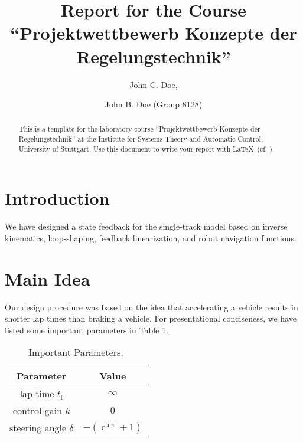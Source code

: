 \documentclass[pdf]{ifacconf}
\begin{document}
\begin{frontmatter}

\title{Report for the Course ``Projektwettbewerb Konzepte der Regelungstechnik''}


\author{\underline{John C. Doe},} 
\author{John B. Doe (Group 8128)} 

\begin{abstract}                          %
This is a template for the laboratory course ``Projektwettbewerb Konzepte der Regelungstechnik'' at the Institute for Systems Theory and Automatic Control, University of Stuttgart. Use this document to write your report with \LaTeX\ (cf. \cite{Knuth2005}).
\end{abstract}

\end{frontmatter}

\section{Introduction}
We have designed a state feedback for the single-track model based on inverse kinematics, loop-shaping, feedback linearization, and robot navigation functions.

\section{Main Idea}
Our design procedure was based on the idea that accelerating a vehicle results in shorter lap times than braking a vehicle. For presentational conciseness, we have listed some important parameters in Table 1.

\begin{table}[h]
\caption{Important Parameters.}
\label{table:working plan}
\centering
\begin{tabular}{|c|c|}
\hline
\bfseries Parameter & \bfseries Value \\ \hline \hline
lap time $t_{\text{f}}$ & $\infty$ \\ \hline
control gain $k$ & $0$ \\ \hline
steering angle $\delta$ & $-\left(\operatorname{e}^{\operatorname{i}\pi}+1\right)$ \\ \hline
 \end{tabular}
\end{table}
\end{document}
